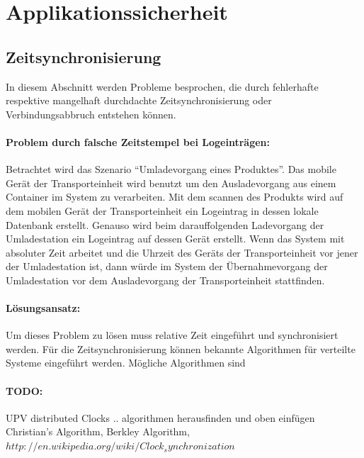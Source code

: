 \section{Applikationssicherheit}
\label{sec:security}

\subsection{Zeitsynchronisierung}
\label{subsec:timesync}

In diesem Abschnitt werden Probleme besprochen, die durch fehlerhafte respektive
mangelhaft durchdachte Zeitsynchronisierung oder Verbindungsabbruch entstehen
können.

\paragraph{Problem durch falsche Zeitstempel bei Logeinträgen:}
Betrachtet wird das Szenario ``Umladevorgang eines Produktes''. Das mobile
Gerät der Transporteinheit wird benutzt um den Ausladevorgang aus einem
Container im System zu verarbeiten. Mit dem scannen des Produkts wird auf dem
mobilen Gerät der Transporteinheit ein Logeintrag in dessen lokale Datenbank
erstellt. Genauso wird beim darauffolgenden Ladevorgang der Umladestation ein
Logeintrag auf dessen Gerät erstellt. Wenn das System mit absoluter Zeit
arbeitet und die Uhrzeit des Geräts der Transporteinheit vor jener der
Umladestation ist, dann würde im System der Übernahmevorgang der Umladestation
vor dem Ausladevorgang der Transporteinheit stattfinden.
\par
\paragraph{Lösungsansatz:}
Um dieses Problem zu lösen muss relative Zeit eingeführt und synchronisiert
werden. Für die Zeitsynchronisierung können bekannte Algorithmen für verteilte
Systeme eingeführt werden. Mögliche Algorithmen sind
\par

\paragraph{TODO:}
UPV distributed Clocks .. algorithmen herausfinden und oben einfügen\\ 

	Christian's Algorithm, Berkley Algorithm, 
	$http://en.wikipedia.org/wiki/Clock_synchronization$
\par


